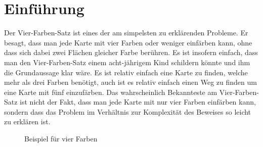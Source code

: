 \section{Einführung}
Der Vier-Farben-Satz ist eines der am simpelsten zu erklärenden Probleme. Er besagt, dass man jede Karte mit vier Farben oder weniger einfärben kann, ohne dass sich dabei zwei Flächen gleicher Farbe berühren. Es ist insofern einfach, dass man den Vier-Farben-Satz einem acht-jährigem Kind schildern könnte und ihm die Grundaussage klar wäre. Es ist relativ einfach eine Karte zu finden, welche mehr als drei Farben benötigt, auch ist es relativ einfach einen Weg zu finden um eine Karte mit fünf einzufärben. Das wahrscheinlich Bekannteste am Vier-Farben-Satz ist nicht der Fakt, dass man jede Karte mit nur vier Farben einfärben kann, sondern dass das Problem im Verhältnis zur Komplexität des Beweises so leicht zu erklären ist.

\begin{center}
    \begin{figure}[h]
        \centering
        \caption{Beispiel für vier Farben}
        \label{fig:my_label}
    \end{figure}
    
    
\end{center}